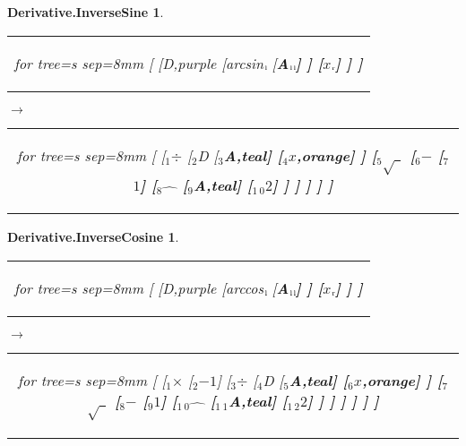 \documentclass[UTF8,10pt]{ctexart}
\newcommand{\Bigskip}{\bigskip\medskip}
\newcommand{\subtreeA}{\bf A}
\newcommand{\I}{$_{\scriptscriptstyle 1}$}
\newcommand{\II}{$_{\scriptscriptstyle 2}$}
\newcommand{\III}{$_{\scriptscriptstyle 3}$}
\newcommand{\IV}{$_{\scriptscriptstyle 4}$}
\newcommand{\V}{$_{\scriptscriptstyle 5}$}
\newcommand{\VI}{$_{\scriptscriptstyle 6}$}
\newcommand{\VII}{$_{\scriptscriptstyle 7}$}
\newcommand{\VIII}{$_{\scriptscriptstyle 8}$}
\newcommand{\IX}{$_{\scriptscriptstyle 9}$}
\newcommand{\X}{$_{\scriptscriptstyle 1\:\!\!0}$}
\newcommand{\XI}{$_{\scriptscriptstyle 1\:\!\!1}$}
\newcommand{\XII}{$_{\scriptscriptstyle 1\:\!\!2}$}
\newcommand{\lc}{$_{\:\!\scriptscriptstyle\rm l\!}$}
\newcommand{\rc}{$_{\:\!\scriptscriptstyle\rm r\!}$}
\newcommand{\Derivative}{\rm D}
\newcommand{\x}{$x$}
\newcommand{\One}{$1$}
\newcommand{\NegativeOne}{$-1$}
\newcommand{\Two}{$2$}
\newcommand{\Subtraction}{$-$}
\newcommand{\Multiplication}{$\times$}
\newcommand{\Division}{$\div$}
\newcommand{\Power}{$\hat{\quad}$}
\newcommand{\SquareRoot}{$\sqrt{\ \ }$}
\newcommand{\InverseSine}{\rm arcsin}
\newcommand{\InverseCosine}{\rm arccos}
\newtheorem*{Derivative.InverseSine}{\bf Derivative.InverseSine }
\newtheorem*{Derivative.InverseCosine}{\bf Derivative.InverseCosine }
\begin{document}
	\begin{center}\vspace*{\fill}
		\begin{Derivative.InverseSine}
			\qquad\par\Bigskip
			\begin{tabular}{c}
				\begin{forest}
					for tree={s sep=8mm}
					[
						[\Derivative,purple
							[\InverseSine\lc
								[\subtreeA\lc\lc]
							]
							[\x\rc]
						]
					]
				\end{forest}
			\end{tabular}
			\qquad
			$\longrightarrow$
			\qquad
			\begin{tabular}{c}
				\begin{forest}
					for tree={s sep=8mm}
					[
						[\I\Division
							[\II\Derivative
								[\III\subtreeA,teal]
								[\IV\x,orange]
							]
							[\V\SquareRoot
								[\VI\Subtraction
									[\VII\One]
									[\VIII\Power
										[\IX\subtreeA,teal]
										[\X\Two]
									]
								]
							]
						]
					]
				\end{forest}
			\end{tabular}
		\end{Derivative.InverseSine}
		\bigskip
		\begin{Derivative.InverseCosine}
			\qquad\par\Bigskip
			\begin{tabular}{c}
				\begin{forest}
					for tree={s sep=8mm}
					[
						[\Derivative,purple
							[\InverseCosine\lc
								[\subtreeA\lc\lc]
							]
							[\x\rc]
						]
					]
				\end{forest}
			\end{tabular}
			\qquad
			$\longrightarrow$
			\qquad
			\begin{tabular}{c}
				\begin{forest}
					for tree={s sep=8mm}
					[
						[\I\Multiplication
							[\II\NegativeOne]
							[\III\Division
								[\IV\Derivative
									[\V\subtreeA,teal]
									[\VI\x,orange]
								]
								[\VII\SquareRoot
									[\VIII\Subtraction
										[\IX\One]
										[\X\Power
											[\XI\subtreeA,teal]
											[\XII\Two]
										]
									]
								]
							]
						]
					]
				\end{forest}
			\end{tabular}
		\end{Derivative.InverseCosine}
	\vspace*{\fill}\end{center}
\end{document}
